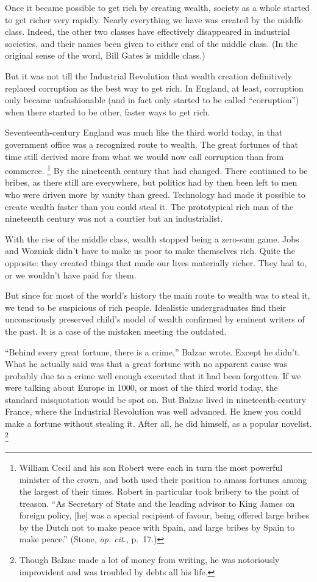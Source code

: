 \documentclass[12pt]{book}
\begin{document}
Once it became possible to get rich by creating wealth, society as a
whole started to get richer very rapidly. Nearly everything we have was
created by the middle class. Indeed, the other two classes have
effectively disappeared in industrial societies, and their names been
given to either end of the middle class. (In the original sense of the
word, Bill Gates is middle class.)

But it was not till the Industrial Revolution that wealth creation
definitively replaced corruption as the best way to get rich. In
England, at least, corruption only became unfashionable (and in fact
only started to be called ``corruption'') when there started to be
other, faster ways to get rich.

Seventeenth-century England was much like the third world today, in that
government office was a recognized route to wealth. The great fortunes
of that time still derived more from what we would now call corruption
than from commerce. \footnote{William Cecil and his son Robert were each in turn the most
powerful minister of the crown, and both used their position to amass
fortunes among the largest of their times. Robert in particular took
bribery to the point of treason. ``As Secretary of State and the leading
advisor to King James on foreign policy, {[}he{]} was a special
recipient of favour, being offered large bribes by the Dutch not to make
peace with Spain, and large bribes by Spain to make peace.'' (Stone,
\emph{op. cit.}, p.~17.)} By the nineteenth century
that had changed. There continued to be bribes, as there still are
everywhere, but politics had by then been left to men who were driven
more by vanity than greed. Technology had made it possible to create
wealth faster than you could steal it. The prototypical rich man of the
nineteenth century was not a courtier but an industrialist.

With the rise of the middle class, wealth stopped being a zero-sum game.
Jobs and Wozniak didn't have to make us poor to make themselves rich.
Quite the opposite: they created things that made our lives materially
richer. They had to, or we wouldn't have paid for them.

But since for most of the world's history the main route to wealth was
to steal it, we tend to be suspicious of rich people. Idealistic
undergraduates find their unconsciously preserved child's model of
wealth confirmed by eminent writers of the past. It is a case of the
mistaken meeting the outdated.

``Behind every great fortune, there is a crime,'' Balzac wrote. Except
he didn't. What he actually said was that a great fortune with no
apparent cause was probably due to a crime well enough executed that it
had been forgotten. If we were talking about Europe in 1000, or most of
the third world today, the standard misquotation would be spot on. But
Balzac lived in nineteenth-century France, where the Industrial
Revolution was well advanced. He knew you could make a fortune without
stealing it. After all, he did himself, as a popular novelist.
\footnote{Though Balzac made a lot of money from writing, he was
notoriously improvident and was troubled by debts all his life.}
\end{document}
